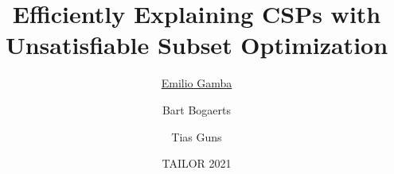 \documentclass[handout]{beamer}
\title{Efficiently Explaining CSPs with Unsatisfiable Subset Optimization}
\institute[shortinst]
{\inst{1} Vrije Universiteit Brussel, Belgium \\ %
	\inst{2} KULeuven, Belgium \\ %
	\href{mailto:emilio.gamba@vub.be}{\underline{emilio.gamba@vub.be}}, \href{mailto:bart.bogaerts@vub.be}{bart.bogaerts@vub.be}, \href{mailto:tias.guns@kuleuven.be}{tias.guns@kuleuven.be} %
}
\date{TAILOR 2021}
\author{\underline{Emilio Gamba}\inst{1} \and  Bart Bogaerts\inst{1} \and   Tias Guns\inst{1,2}}
\begin{document}
	\begin{frame}
		\maketitle
	\end{frame}
	
\end{document}
